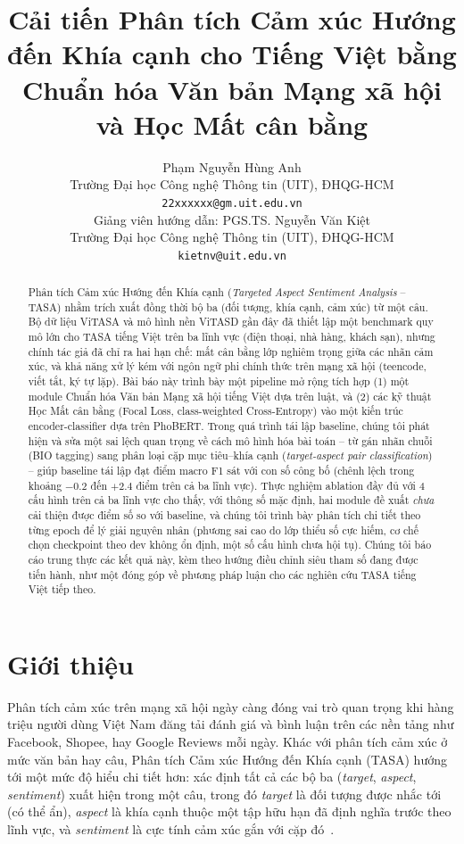 \documentclass[11pt]{article}
\title{Cải tiến Phân tích Cảm xúc Hướng đến Khía cạnh cho Tiếng Việt bằng Chuẩn hóa Văn bản Mạng xã hội và Học Mất cân bằng}
\author{
  Phạm Nguyễn Hùng Anh \\
  Trường Đại học Công nghệ Thông tin (UIT), ĐHQG-HCM \\
  \texttt{22xxxxxx@gm.uit.edu.vn} \\
  \And
  Giảng viên hướng dẫn: PGS.TS. Nguyễn Văn Kiệt \\
  Trường Đại học Công nghệ Thông tin (UIT), ĐHQG-HCM \\
  \texttt{kietnv@uit.edu.vn}
}
\begin{document}
\maketitle

\begin{abstract}
Phân tích Cảm xúc Hướng đến Khía cạnh (\textit{Targeted Aspect Sentiment Analysis} -- TASA) nhằm trích xuất đồng thời bộ ba (đối tượng, khía cạnh, cảm xúc) từ một câu. Bộ dữ liệu ViTASA và mô hình nền ViTASD gần đây đã thiết lập một benchmark quy mô lớn cho TASA tiếng Việt trên ba lĩnh vực (điện thoại, nhà hàng, khách sạn), nhưng chính tác giả đã chỉ ra hai hạn chế: mất cân bằng lớp nghiêm trọng giữa các nhãn cảm xúc, và khả năng xử lý kém với ngôn ngữ phi chính thức trên mạng xã hội (teencode, viết tắt, ký tự lặp). Bài báo này trình bày một pipeline mở rộng tích hợp (1) một module Chuẩn hóa Văn bản Mạng xã hội tiếng Việt dựa trên luật, và (2) các kỹ thuật Học Mất cân bằng (Focal Loss, class-weighted Cross-Entropy) vào một kiến trúc encoder-classifier dựa trên PhoBERT. Trong quá trình tái lập baseline, chúng tôi phát hiện và sửa một sai lệch quan trọng về cách mô hình hóa bài toán -- từ gán nhãn chuỗi (BIO tagging) sang phân loại cặp mục tiêu--khía cạnh (\textit{target-aspect pair classification}) -- giúp baseline tái lập đạt điểm macro F1 sát với con số công bố (chênh lệch trong khoảng $-0.2$ đến $+2.4$ điểm trên cả ba lĩnh vực). Thực nghiệm ablation đầy đủ với 4 cấu hình trên cả ba lĩnh vực cho thấy, với thông số mặc định, hai module đề xuất \emph{chưa} cải thiện được điểm số so với baseline, và chúng tôi trình bày phân tích chi tiết theo từng epoch để lý giải nguyên nhân (phương sai cao do lớp thiểu số cực hiếm, cơ chế chọn checkpoint theo dev không ổn định, một số cấu hình chưa hội tụ). Chúng tôi báo cáo trung thực các kết quả này, kèm theo hướng điều chỉnh siêu tham số đang được tiến hành, như một đóng góp về phương pháp luận cho các nghiên cứu TASA tiếng Việt tiếp theo.
\end{abstract}

\section{Giới thiệu}
\label{sec:intro}

Phân tích cảm xúc trên mạng xã hội ngày càng đóng vai trò quan trọng khi hàng triệu người dùng Việt Nam đăng tải đánh giá và bình luận trên các nền tảng như Facebook, Shopee, hay Google Reviews mỗi ngày. Khác với phân tích cảm xúc ở mức văn bản hay câu, Phân tích Cảm xúc Hướng đến Khía cạnh (TASA) hướng tới một mức độ hiểu chi tiết hơn: xác định tất cả các bộ ba (\textit{target}, \textit{aspect}, \textit{sentiment}) xuất hiện trong một câu, trong đó \textit{target} là đối tượng được nhắc tới (có thể ẩn), \textit{aspect} là khía cạnh thuộc một tập hữu hạn đã định nghĩa trước theo lĩnh vực, và \textit{sentiment} là cực tính cảm xúc gắn với cặp đó~\citep{saeidi2016sentihood}.
\end{document}
